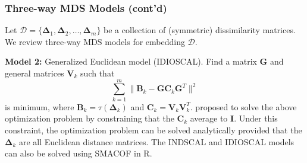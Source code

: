 \documentclass[professionalfonts,hyperref={pdfpagelabels=false,colorlinks=true,linkcolor=blue}]{beamer}
\begin{document}
\begin{frame}
  \frametitle{Three-way MDS Models (cont'd)} Let $\mathscr{D} =
  \{\bm{\Delta}_{1}, \bm{\Delta}_{2}, \dots, \bm{\Delta}_{m}\}$ be a
  collection of (symmetric) dissimilarity matrices. We review
  three-way MDS models for embedding $\mathscr{D}$.

  
  \vskip10pt{\bf Model 2:} Generalized Euclidean model (IDIOSCAL). Find a matrix
  $\mathbf{G}$ and general matrices $\mathbf{V}_k$ such that 
  \begin{equation*}
    \sum_{k=1}^{m}{\|\mathbf{B}_k -
      \mathbf{G}\mathbf{C}_k\mathbf{G}^{T}\|^{2}}
  \end{equation*}
  is minimum, where $\mathbf{B}_k = \tau(\bm{\Delta}_{k})$ and
  $\mathbf{C}_k = \mathbf{V}_{k} \mathbf{V}_k^{T}$. 
  \vskip10pt \cite{schonemann72} proposed to solve the above
  optimization problem by constraining that the $\mathbf{C}_k$ average
  to $\mathbf{I}$. Under this constraint, the optimization problem can
  be solved analytically provided that the $\bm{\Delta}_k$ are all
  Euclidean distance matrices. The INDSCAL and IDIOSCAL models
  can also be solved using SMACOF \cite{leeuw09:_multid}
  in R. 
\end{frame}

\end{document}
